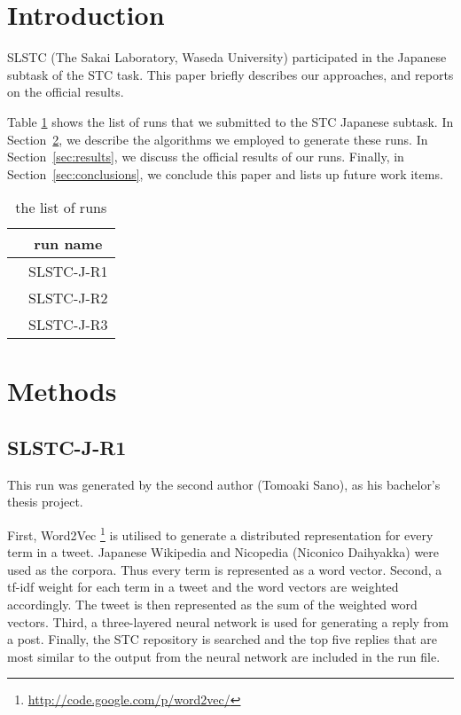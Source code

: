 \documentclass{../style/sig-alternate}
\begin{document}

\section{Introduction}

SLSTC (The Sakai Laboratory, Waseda University) participated in the
Japanese subtask of the STC task.
This paper briefly describes our approaches,
and reports on the official results.

Table \ref{tab:run_list}  shows the list of runs that we submitted to the STC Japanese subtask.
In Section~\ref{sec:methods}, we describe the algorithms we employed
to generate these runs.
In Section~\ref{sec:results}, we discuss the official results of our runs.
Finally, in Section~\ref{sec:conclusions}, we conclude this paper
and lists up future work items.

\begin{table}[h!]
  \centering
  \caption{the list of runs}
  \label{tab:run_list}
  \begin{tabular}{|c|} \hline
    　run name \\ \hline
    　SLSTC-J-R1 \\ \hline
    　SLSTC-J-R2 \\ \hline
    　SLSTC-J-R3 \\ \hline
  \end{tabular}
\end{table}

\section{Methods}
\label{sec:methods}

\subsection{SLSTC-J-R1}

This run was generated by the second author (Tomoaki Sano), as his bachelor's thesis project.

First, Word2Vec \footnote{\url{http://code.google.com/p/word2vec/}} is utilised 
to generate a distributed representation for every term in a tweet. Japanese Wikipedia and Nicopedia (Niconico Daihyakka) were used as the corpora. Thus every term is represented as a word vector. Second, a tf-idf weight for each term in a tweet and the word vectors are weighted accordingly. The tweet is then represented as the sum of the weighted word vectors. Third, a three-layered neural network is used for generating a reply from a post. Finally, the STC repository is searched and 
the top five replies that are most similar to the output from the neural network are 
included in the run file.
\end{document}
